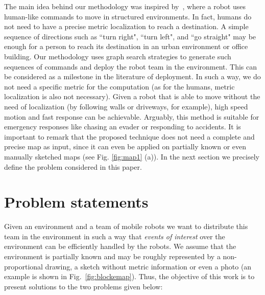 \documentclass[smallcondensed]{svjour3}
\begin{document}
%
The main idea behind our methodology was inspired by~\cite{Arthur2015}, where a robot uses human-like commands to move in structured environments. In fact, humans do not need to have a precise metric localization to reach a destination. A simple sequence of directions such as ``turn right", ``turn left", and ``go straight" may be enough for a person to reach its destination in an urban environment or office building. Our methodology uses graph search strategies to generate such sequences of commands and deploy the robot team in the environment. 
%
This can be considered as a milestone in the literature of deployment. In such a way, we do not need a specific metric for the computation (as for the humans, metric localization is also not necessary). Given a robot that is able to move without the need of localization (by following walls or driveways, for example), high speed motion and fast response can be achievable. Arguably, this method is suitable for emergency responses like chasing an evader or responding to accidents. It is important to remark that the proposed technique does not need a complete and precise map as input, since it can even be applied on partially known or even manually sketched maps (see Fig. \ref{fig:map1} (a)). 
In the next section we precisely define the problem considered in this paper.  

%
\section{Problem statements}
\label{sec:probstate}

Given an environment and a team of mobile robots we want to distribute this team in the environment in such a way that \textit{events of interest} over the environment can be efficiently handled by the robots. We assume that the environment is partially known and may be roughly represented by a non-proportional drawing, a sketch without metric information or even a photo (an example is shown in Fig.~\ref{fig:blockemap}). %
Thus, the objective of this work is to present solutions to the two problems given below:
\end{document}
